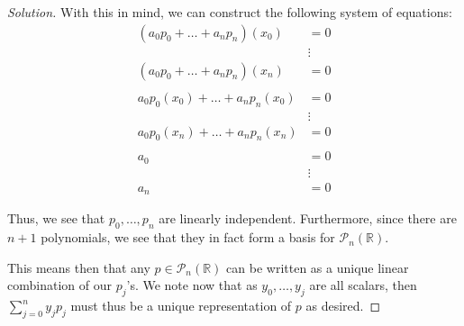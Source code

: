 \documentclass{article}
\newenvironment{solution}{\begin{proof}[Solution]}{\end{proof}}
\newcommand{\RR}{\mathbb{R}}
\begin{document}
\begin{solution}
		With this in mind, we can construct the following system of equations:
		\begin{align*}
			(a_{0}p_{0} + \ldots + a_{n}p_{n})(x_{0}) &= 0 \\
			&\vdots \\
			(a_{0}p_{0} + \ldots + a_{n}p_{n})(x_{n}) &= 0 \\
			\\
			a_{0}p_{0}(x_{0}) + \ldots + a_{n}p_{n}(x_{0}) &= 0 \\
			&\vdots \\
			a_{0}p_{0}(x_{n}) + \ldots + a_{n}p_{n}(x_{n}) &= 0 \\
			\\
			a_{0} &= 0 \\
			&\vdots \\
			a_{n} &= 0
		\end{align*}
	
		Thus, we see that $p_{0}, \ldots, p_{n}$ are linearly independent. Furthermore, since there are $n+1$ polynomials, we see that they in fact form a basis for $\mathscr{P}_{n}(\RR)$.
		
		This means then that any $p \in \mathscr{P}_{n}(\RR)$ can be written as a unique linear combination of our $p_{j}$'s. We note now that as $y_{0}, \ldots, y_{j}$ are all scalars, then $\sum_{j=0}^{n} y_{j}p_{j}$ must thus be a unique representation of $p$ as desired.
	\end{solution}

	\newpage
	
\end{document}
